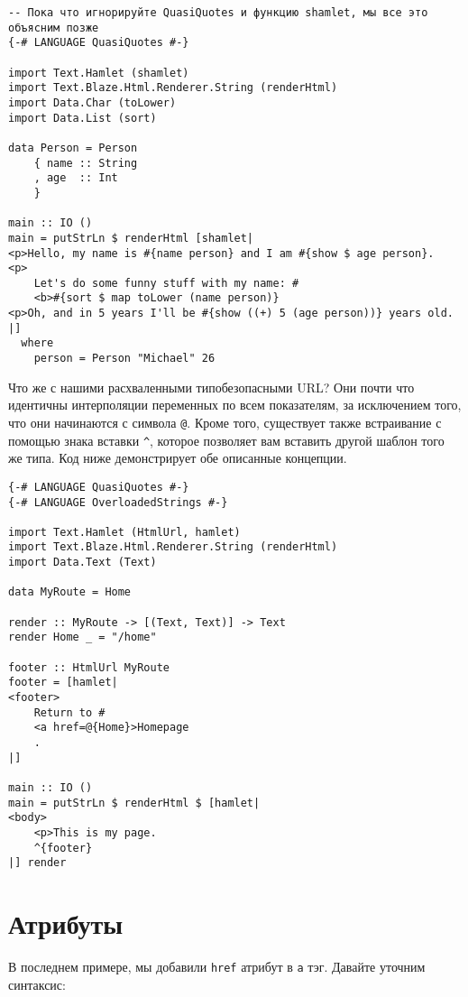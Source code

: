 \begin{lstlisting}
-- Пока что игнорируйте QuasiQuotes и функцию shamlet, мы все это объясним позже
{-# LANGUAGE QuasiQuotes #-}

import Text.Hamlet (shamlet)
import Text.Blaze.Html.Renderer.String (renderHtml)
import Data.Char (toLower)
import Data.List (sort)

data Person = Person
    { name :: String
    , age  :: Int
    }

main :: IO ()
main = putStrLn $ renderHtml [shamlet|
<p>Hello, my name is #{name person} and I am #{show $ age person}.
<p>
    Let's do some funny stuff with my name: #
    <b>#{sort $ map toLower (name person)}
<p>Oh, and in 5 years I'll be #{show ((+) 5 (age person))} years old.
|]
  where
    person = Person "Michael" 26
\end{lstlisting}

Что же с нашими расхваленными типобезопасными URL? Они почти что идентичны
интерполяции переменных по всем показателям, за исключением того, что они
начинаются с символа \texttt{@}. Кроме того, существует также встраивание с помощью
знака вставки \texttt{^}, которое позволяет вам вставить другой шаблон того же типа.
Код ниже демонстрирует обе описанные концепции.

\begin{lstlisting}
{-# LANGUAGE QuasiQuotes #-}
{-# LANGUAGE OverloadedStrings #-}

import Text.Hamlet (HtmlUrl, hamlet)
import Text.Blaze.Html.Renderer.String (renderHtml)
import Data.Text (Text)

data MyRoute = Home

render :: MyRoute -> [(Text, Text)] -> Text
render Home _ = "/home"

footer :: HtmlUrl MyRoute
footer = [hamlet|
<footer>
    Return to #
    <a href=@{Home}>Homepage
    .
|]

main :: IO ()
main = putStrLn $ renderHtml $ [hamlet|
<body>
    <p>This is my page.
    ^{footer}
|] render
\end{lstlisting}

\section{Атрибуты}
В последнем примере, мы добавили \texttt{href} атрибут в \texttt{a} тэг. Давайте
уточним синтаксис:

